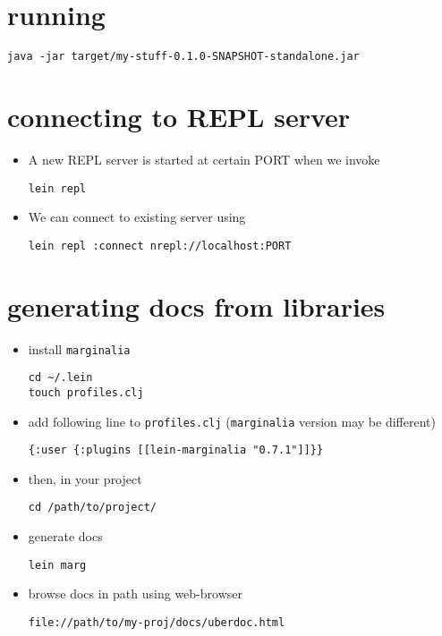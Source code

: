 \documentclass[11pt]{article}
\begin{document}
\section{running}
\label{sec-6}


\begin{verbatim}
java -jar target/my-stuff-0.1.0-SNAPSHOT-standalone.jar
\end{verbatim}
\section{connecting to REPL server}
\label{sec-7}

\begin{itemize}
\item A new REPL server is started at certain PORT when we invoke

\begin{verbatim}
lein repl
\end{verbatim}
\item We can connect to existing server using

\begin{verbatim}
lein repl :connect nrepl://localhost:PORT
\end{verbatim}
\end{itemize}
\section{generating docs from libraries}
\label{sec-8}

\begin{itemize}
\item install \texttt{marginalia}

\begin{verbatim}
cd ~/.lein
touch profiles.clj
\end{verbatim}
\item add following line to \texttt{profiles.clj} (\texttt{marginalia} version may be
     different)

\begin{verbatim}
{:user {:plugins [[lein-marginalia "0.7.1"]]}}
\end{verbatim}
\item then, in your project 

\begin{verbatim}
cd /path/to/project/
\end{verbatim}
\item generate docs

\begin{verbatim}
lein marg
\end{verbatim}
\item browse docs in path using web-browser

\begin{verbatim}
file://path/to/my-proj/docs/uberdoc.html
\end{verbatim}
\end{itemize}
\end{document}

